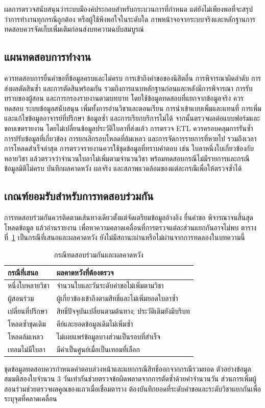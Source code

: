 ผลการตรวจสนับสนุนว่าระบบมีองค์ประกอบสำหรับกระบวนการที่กำหนด
แต่ยังไม่เพียงพอที่จะสรุปว่าการทำงานทุกกรณีถูกต้อง
หรือผู้ใช้พึงพอใจในระดับใด
ภาพหน้าจอจากระบบจริงและหลักฐานการทดสอบควรจัดเก็บเพิ่มเติมก่อนส่งบทความฉบับสมบูรณ์
\subsection{แผนทดสอบการทำงาน}
ควรทดสอบการยื่นคำขอที่ข้อมูลครบและไม่ครบ การเข้าถึงคำขอของนิสิตอื่น
การพิจารณาผิดลำดับ การส่งผลตัดสินซ้ำ และการตัดสินพร้อมกัน
รวมถึงการแนบหลักฐานก่อนและหลังมีการพิจารณา การรับทราบของผู้สอน
และการกรองรายงานตามบทบาท โดยใช้ข้อมูลทดสอบที่แยกจากข้อมูลจริง
ควรทดสอบ ระบบข้อมูลสนับสนุน เพิ่มทั้งการอ่านวิชาและตอนเรียน
การนำเข้าแบบเพิ่มและแทนที่ การเพิ่มและแก้ไขข้อมูลอาจารย์ที่ปรึกษา
ข้อมูลซ้ำ และการเรียกบริการไม่ได้
จากนั้นตรวจผลต่อแบบฟอร์มและขอบเขตรายงาน
โดยไม่เปลี่ยนข้อมูลประวัติใบลาที่ส่งแล้ว การตรวจ ETL
ควรครอบคลุมการรันซ้ำ การปรับข้อมูลที่เกี่ยวข้อง
การยกเลิกรอบโหลดที่ล้มเหลว และการจัดการรายการที่หายไป
รวมถึงเวลาการโหลดสำเร็จล่าสุด
การตรวจรายงานควรใช้ชุดข้อมูลที่ทราบคำตอบ เช่น
ใบลาหนึ่งใบเกี่ยวข้องกับหลายวิชา
แล้วตรวจว่าจำนวนใบลาไม่เพิ่มตามจำนวนวิชา
พร้อมทดสอบกรณีไม่มีรายการและกรณีข้อมูลมิติไม่ครบ บันทึกผลคาดหวัง
ผลจริง และสภาพแวดล้อมของแต่ละกรณีเพื่อให้ตรวจซ้ำได้
\subsection{เกณฑ์ยอมรับสำหรับการทดสอบร่วมกัน}
การทดสอบร่วมกันควรติดตามเส้นทางเดียวตั้งแต่จัดเตรียมข้อมูลอ้างอิง
ยื่นคำขอ พิจารณาจนสิ้นสุด โหลดข้อมูล แล้วอ่านรายงาน
เพื่อหาความคลาดเคลื่อนที่การตรวจแต่ละส่วนแยกกันอาจไม่พบ
ตารางที่~\ref{tab:acceptance} เป็นกรณีที่เสนอและผลคาดหวัง
ยังไม่มีสถานะผ่านหรือไม่ผ่านจากการทดลองในบทความนี้
\begin{table}[H]
  \caption{กรณีทดสอบร่วมกันและผลคาดหวัง}\label{tab:acceptance}
  \centering
  \begin{tabularx}{\columnwidth}{|p{25mm}|X|}
    \hline
    กรณีที่เสนอ & ผลคาดหวังที่ต้องตรวจ \\ \hline
    หนึ่งใบหลายวิชา & จำนวนใบและวันระดับคำขอไม่เพิ่มตามวิชา \\ \hline
    ผู้สอนร่วม & ผู้เกี่ยวข้องเข้าถึงตามสิทธิ์และไม่เพิ่มยอดใบลาซ้ำ \\ \hline
    เปลี่ยนที่ปรึกษา & สิทธิ์ปัจจุบันเปลี่ยนตามต้นทาง;
    ประวัติเดิมยังมีบริบท \\ \hline
    โหลดซ้ำชุดเดิม & คีย์และยอดข้อมูลเดิมไม่เพิ่มซ้ำ \\ \hline
    โหลดล้มเหลว & ไม่เผยแพร่ข้อมูลบางส่วนเป็นรอบที่สำเร็จ \\ \hline
    เทอมไม่มีใบลา & มีค่าเป็นศูนย์เมื่อเป็นเทอมที่เลือก \\ \hline
  \end{tabularx}
\end{table}
ชุดข้อมูลทดสอบควรกำหนดคำตอบล่วงหน้าและแยกกรณีสิทธิ์ออกจากกรณีรวมยอด
ตัวอย่างข้อมูลสมมติสองใบจำนวน 3
วันเท่ากันช่วยตรวจข้อผิดพลาดจากการตัดซ้ำด้วยค่าจำนวนวัน
ส่วนการเพิ่มผู้สอนร่วมช่วยตรวจผลคูณของแถวเมื่อเชื่อมตาราง
ต้องบันทึกยอดที่ระดับคำขอและระดับวิชาแยกกันเพื่อระบุจุดที่คลาดเคลื่อน
